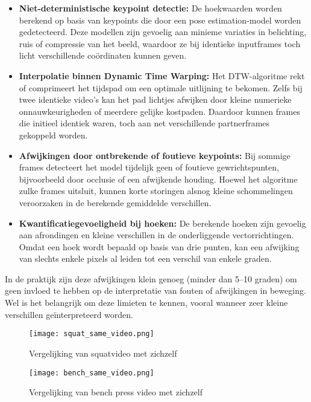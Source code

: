 \begin{itemize}
    \item \textbf{Niet-deterministische keypoint detectie:} De hoekwaarden worden berekend op basis van keypoints die door een pose estimation-model worden gedetecteerd. Deze modellen zijn gevoelig aan minieme variaties in belichting, ruis of compressie van het beeld, waardoor ze bij identieke inputframes toch licht verschillende coördinaten kunnen geven.
    
    \item \textbf{Interpolatie binnen Dynamic Time Warping:} Het DTW-algoritme rekt of comprimeert het tijdspad om een optimale uitlijning te bekomen. Zelfs bij twee identieke video’s kan het pad lichtjes afwijken door kleine numerieke onnauwkeurigheden of meerdere gelijke kostpaden. Daardoor kunnen frames die initieel identiek waren, toch aan net verschillende partnerframes gekoppeld worden.
    
    \item \textbf{Afwijkingen door ontbrekende of foutieve keypoints:} Bij sommige frames detecteert het model tijdelijk geen of foutieve gewrichtspunten, bijvoorbeeld door occlusie of een afwijkende houding. Hoewel het algoritme zulke frames uitsluit, kunnen korte storingen alsnog kleine schommelingen veroorzaken in de berekende gemiddelde verschillen.
    
    \item \textbf{Kwantificatiegevoeligheid bij hoeken:} De berekende hoeken zijn gevoelig aan afrondingen en kleine verschillen in de onderliggende vectorrichtingen. Omdat een hoek wordt bepaald op basis van drie punten, kan een afwijking van slechts enkele pixels al leiden tot een verschil van enkele graden.
\end{itemize}

In de praktijk zijn deze afwijkingen klein genoeg (minder dan 5–10 graden) om geen invloed te hebben op de interpretatie van fouten of afwijkingen in beweging. Wel is het belangrijk om deze limieten te kennen, vooral wanneer zeer kleine verschillen geïnterpreteerd worden.

\begin{figure}[h]
\centering
\texttt{[image: squat\_same\_video.png]}
\caption{Vergelijking van squatvideo met zichzelf}
\label{fig:squat_same}
\end{figure}

\begin{figure}[h]
\centering
\texttt{[image: bench\_same\_video.png]}
\caption{Vergelijking van bench press video met zichzelf}
\label{fig:bench_same}
\end{figure}

